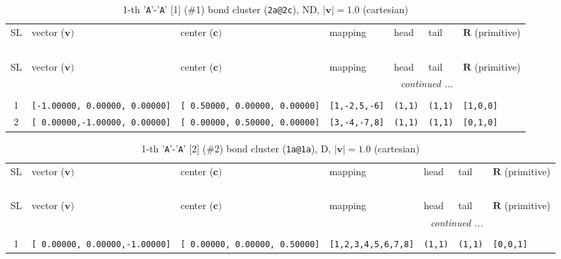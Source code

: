 \documentclass[fleqn,10pt,landscape]{jsarticle}
\begin{document}
\renewcommand{\arraystretch}{1.6}
\begin{longtable}[l]{cllllll}
\captionsetup{justification=raggedright, singlelinecheck=off}
\caption{1-th '\texttt{A}'-'\texttt{A}' [1] (\#1) bond cluster (\texttt{2a@2c}), ND, $|\bm{v}|=1.0$ (cartesian)}
 \\
 \hline \hline
SL & vector ($\bm{v})$ & center ($\bm{c})$ & mapping & head & tail & $\bm{R}$ (primitive) \\ \hline \endfirsthead

\multicolumn{6}{l}{\tablename\ \thetable{}} \\
 \hline \hline
SL & vector ($\bm{v})$ & center ($\bm{c})$ & mapping & head & tail & $\bm{R}$ (primitive) \\ \hline \endhead

 \hline \hline
\multicolumn{6}{r}{\footnotesize\it continued ...} \\ \endfoot

 \hline \hline
\multicolumn{6}{r}{} \\ \endlastfoot

1 & \texttt{[-1.00000, 0.00000, 0.00000]} & \texttt{[ 0.50000, 0.00000, 0.00000]} & \texttt{[1,-2,5,-6]} & \texttt{(1,1)} & \texttt{(1,1)} & \texttt{[1,0,0]} \\ \hline
2 & \texttt{[ 0.00000,-1.00000, 0.00000]} & \texttt{[ 0.00000, 0.50000, 0.00000]} & \texttt{[3,-4,-7,8]} & \texttt{(1,1)} & \texttt{(1,1)} & \texttt{[0,1,0]} \\
\end{longtable}
\renewcommand{\arraystretch}{1.6}
\begin{longtable}[l]{cllllll}
\captionsetup{justification=raggedright, singlelinecheck=off}
\caption{1-th '\texttt{A}'-'\texttt{A}' [2] (\#2) bond cluster (\texttt{1a@1a}), D, $|\bm{v}|=1.0$ (cartesian)}
 \\
 \hline \hline
SL & vector ($\bm{v})$ & center ($\bm{c})$ & mapping & head & tail & $\bm{R}$ (primitive) \\ \hline \endfirsthead

\multicolumn{6}{l}{\tablename\ \thetable{}} \\
 \hline \hline
SL & vector ($\bm{v})$ & center ($\bm{c})$ & mapping & head & tail & $\bm{R}$ (primitive) \\ \hline \endhead

 \hline \hline
\multicolumn{6}{r}{\footnotesize\it continued ...} \\ \endfoot

 \hline \hline
\multicolumn{6}{r}{} \\ \endlastfoot

1 & \texttt{[ 0.00000, 0.00000,-1.00000]} & \texttt{[ 0.00000, 0.00000, 0.50000]} & \texttt{[1,2,3,4,5,6,7,8]} & \texttt{(1,1)} & \texttt{(1,1)} & \texttt{[0,0,1]} \\
\end{longtable}
\end{document}
